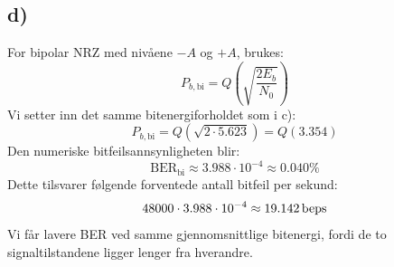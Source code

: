 \subsection*{d)}
For bipolar NRZ med nivåene $-A$ og $+A$, brukes:
\[
    P_{b,\mathrm{bi}}=Q\!\left(\sqrt{\frac{2E_b}{N_0}}\right)
\]
Vi setter inn det samme bitenergiforholdet som i c):
\[
    P_{b,\mathrm{bi}}=Q(\sqrt{2\cdot5.623})
                     =Q(3.354)
\]
Den numeriske bitfeilsannsynligheten blir:
\[
    \boxed{\mathrm{BER}_{\mathrm{bi}}\approx3.988\cdot10^{-4}
    \approx0.040\%}
\]
Dette tilsvarer følgende forventede antall bitfeil per sekund:
\[
    48000\cdot3.988\cdot10^{-4}
                        \approx19.142\,\mathrm{beps}
\]
Vi får lavere BER ved samme gjennomsnittlige bitenergi, fordi de to signaltilstandene ligger lenger fra hverandre.
